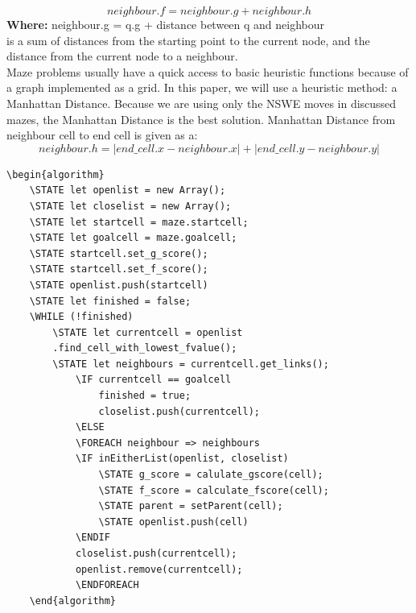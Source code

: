 \begin{equation}
neighbour.f = neighbour.g + neighbour.h
\end{equation}
\textbf{Where:}
neighbour.g = q.g + distance between q and neighbour\\
is a sum of distances from the starting point to the current node, and the distance from the current node to a neighbour.	\\
\newline
Maze problems usually have a quick access to basic heuristic functions because of a graph implemented as a grid. In this paper, we will use a heuristic method: a Manhattan Distance. Because we are using only the NSWE moves in discussed mazes, the Manhattan Distance is the best solution.
Manhattan Distance from neighbour cell to end cell is given as a:
\begin{equation}
neighbour.h = |end\_cell.x - neighbour.x| + |end\_cell.y - neighbour.y|
\end{equation}
\begin{lstlisting}[caption={Pseudocode for a Dijkstra’s algorithm}]
	\begin{algorithm}
	\STATE let openlist = new Array();
	\STATE let closelist = new Array();
	\STATE let startcell = maze.startcell;
	\STATE let goalcell = maze.goalcell;
	\STATE startcell.set_g_score();
	\STATE startcell.set_f_score();
	\STATE openlist.push(startcell)
	\STATE let finished = false;
	\WHILE (!finished)
		\STATE let currentcell = openlist    
		.find_cell_with_lowest_fvalue();
		\STATE let neighbours = currentcell.get_links();
			\IF currentcell == goalcell
				finished = true;
				closelist.push(currentcell);
			\ELSE 
			\FOREACH neighbour => neighbours	
			\IF inEitherList(openlist, closelist)
				\STATE g_score = calulate_gscore(cell);
				\STATE f_score = calculate_fscore(cell);
				\STATE parent = setParent(cell);
				\STATE openlist.push(cell)
			\ENDIF
			closelist.push(currentcell);
			openlist.remove(currentcell);
	    	\ENDFOREACH
	\end{algorithm}
	\end{lstlisting}

